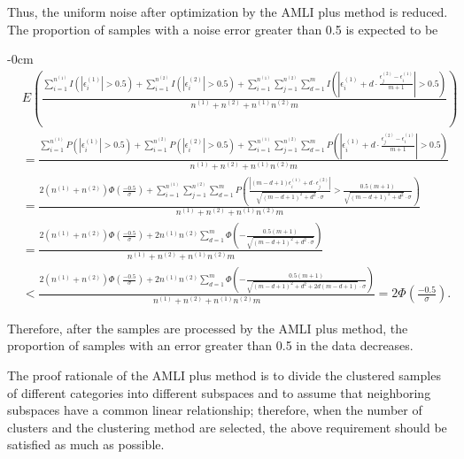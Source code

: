 \documentclass[mathematics,article,accept,pdftex,moreauthors]{Definitions/mdpi}
\begin{document}
Thus, the uniform noise after optimization by the AMLI plus method is reduced. The proportion of samples with a noise error greater than 0.5 is expected to be
\vspace{-12pt}
\begin{adjustwidth}{-\extralength}{0cm}%
\begin{equation*}
	\begin{split}
& E(\frac{\sum_{i=1}^{n^{(1)}} I (|\epsilon_{i}^{(1)}| > 0.5 ) + \sum_{i=1}^{n^{(2)}} I (|\epsilon_{i}^{(2)}| > 0.5 )  + \sum_{i=1}^{n^{(1)}}\sum_{j=1}^{n^{(2)}}\sum_{d=1}^{m}I( \left|\epsilon_{i}^{(1)} + d \cdot \frac{ \epsilon_{j}^{(2)} - \epsilon_{i}^{(1)} }{m+1}  \right| >0.5)
}
{n^{(1)}+n^{(2)}+n^{(1)}n^{(2)}m}) \\ 
& = \frac{\sum_{i=1}^{n^{(1)}} P (|\epsilon_{i}^{(1)}| > 0.5 ) + \sum_{i=1}^{n^{(2)}} P (|\epsilon_{i}^{(2)}| > 0.5 )  + \sum_{i=1}^{n^{(1)}}\sum_{j=1}^{n^{(2)}}\sum_{d=1}^{m}P( \left|\epsilon_{i}^{(1)} + d \cdot \frac{ \epsilon_{j}^{(2)} - \epsilon_{i}^{(1)} }{m+1}  \right| >0.5)
}
{n^{(1)}+n^{(2)}+n^{(1)}n^{(2)}m} \\ 
& = \frac{2(n^{(1)} + n^{(2)})\Phi\left(\displaystyle{\frac{-0.5}{\sigma}}\right)  + \sum_{i=1}^{n^{(1)}}\sum_{j=1}^{n^{(2)}}\sum_{d=1}^{m}
	P(\displaystyle{\frac{|(m-d+1)\epsilon_{i}^{(1)} + d\cdot \epsilon_{j}^{(2)}|}{\sqrt{(m-d+1)^{2} + d^{2}} \cdot \sigma}}  > \frac{0.5(m+1)}{\sqrt{(m-d+1)^{2} + d^{2}} \cdot \sigma})
}
{n^{(1)}+n^{(2)}+n^{(1)}n^{(2)}m} \\ 
& = \frac{2(n^{(1)} + n^{(2)})\Phi\left(\displaystyle{\frac{-0.5}{\sigma}}\right)  + 2n^{(1)}n^{(2)}\sum_{d=1}^{m}\Phi\left(-\displaystyle{\frac{0.5(m+1)}{\sqrt{(m-d+1)^{2} + d^{2} \cdot \sigma}}}\right)
}
{n^{(1)}+n^{(2)}+n^{(1)}n^{(2)}m} \\ 
& < \frac{2(n^{(1)} + n^{(2)})\Phi\left(\displaystyle{\frac{-0.5}{\sigma}}\right)  + 2n^{(1)}n^{(2)}\sum_{d=1}^{m}\Phi\left(-\displaystyle{\frac{0.5(m+1)}{\sqrt{(m-d+1)^{2} + d^{2} +2d(m-d+1) }\cdot \sigma}}\right)
}
{n^{(1)}+n^{(2)}+n^{(1)}n^{(2)}m} = 2 \Phi\left(\frac{-0.5}{\sigma}\right).
\end{split}
\end{equation*}
\end{adjustwidth}

Therefore, after the samples are processed by the AMLI plus method, the proportion of samples with an error greater than 0.5 in the data decreases.

\begin{Remark}
 {The} 
 proof rationale of the AMLI plus method is to divide the clustered samples of different categories into different subspaces and to assume that neighboring subspaces have a common linear relationship; therefore, when the number of clusters and the clustering method are selected, the above requirement should be satisfied as much as possible.
\end{Remark}
\end{document}
